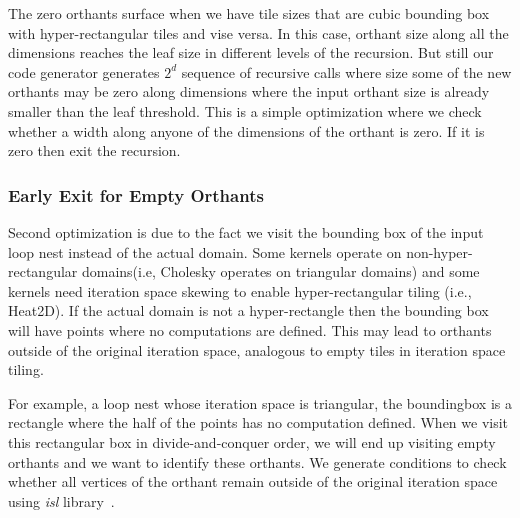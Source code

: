 The zero orthants surface when we have tile sizes that are cubic bounding box with
hyper-rectangular tiles and vise versa. In this case, orthant size along all
the dimensions reaches the leaf size in different levels of the recursion. But
still our code generator generates $2^d$ sequence of recursive calls where
size some of the new orthants may be zero along dimensions where the input
orthant size is already smaller than the leaf threshold.  This is a simple
optimization where we check whether a width along anyone of the dimensions of
the orthant is zero. If it is zero then exit the recursion.

\subsubsection{Early Exit for Empty Orthants}
Second optimization is due to the fact we visit the bounding box of the input
loop nest instead of the actual domain. Some kernels operate on
non-hyper-rectangular domains(i.e, Cholesky  operates on triangular domains)
and some kernels need iteration space skewing to enable hyper-rectangular
tiling (i.e., Heat2D). If the actual domain is not a hyper-rectangle then the
bounding box will have points where no computations are defined.  This may
lead to orthants outside of the original iteration space, analogous to empty
tiles in iteration space tiling. 

For example, a loop nest whose iteration space is triangular, the boundingbox
is a rectangle where the half of the points has no computation defined. When
we visit this rectangular box in divide-and-conquer order, we will end up
visiting empty orthants and we want to identify these orthants.  We generate
conditions to check whether all vertices of the orthant remain outside of the
original iteration space using \emph{isl} library~\cite{verdoolaege2010isl}.


